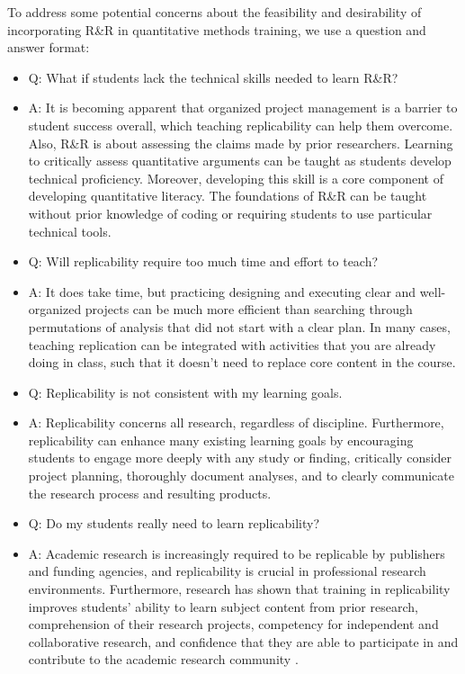 \documentclass[
  12pt]{article}
\begin{document}
To address some potential concerns about the feasibility and desirability of incorporating R\&R in quantitative methods training, we use a question and answer format: 
\begin{itemize}
    \item Q: What if students lack the technical skills needed to learn R\&R? 
    \item A: It is becoming apparent that organized project management is a barrier to student success overall, which teaching replicability can help them overcome. Also, R\&R is about assessing the claims made by prior researchers. Learning to critically assess quantitative arguments can be taught as students develop technical proficiency. Moreover, developing this skill is a core component of developing quantitative literacy. The foundations of R\&R can be taught without prior knowledge of coding or requiring students to use particular technical tools.

    \item Q: Will replicability require too much time and effort to teach?
    \item A: It does take time, but practicing designing and executing clear and well-organized projects can be much more efficient than searching through permutations of analysis that did not start with a clear plan. In many cases, teaching replication can be integrated with activities that you are already doing in class, such that it doesn’t need to replace core content in the course.

    \item Q: Replicability is not consistent with my learning goals.
    \item A: Replicability concerns all research, regardless of discipline. Furthermore, replicability can enhance many existing learning goals by encouraging students to engage more deeply with any study or finding, critically consider project planning, thoroughly document analyses, and to clearly communicate the research process and resulting products.
    \item Q: Do my students really need to learn replicability?
    \item A:  Academic research is increasingly required to be replicable by publishers and funding agencies, and replicability is crucial in professional research environments. Furthermore, research has shown that training in replicability improves students’ ability to learn subject content from prior research, comprehension of their research projects, competency for independent and collaborative research, and confidence that they are able to participate in and contribute to the academic research community \citep{pownall_teaching_2023}.
\end{itemize}
\end{document}
